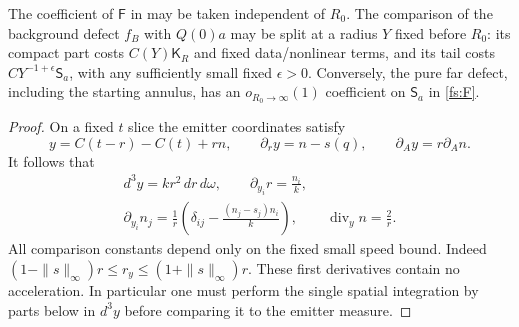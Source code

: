 \begin{lemma}
\label{fs:uniform-coupling}
The coefficient of $\mathsf F$ in  may be taken independent
of $R_0$.  The comparison of the background defect $f_B$ with $Q(0)a$
may be split at a radius $Y$ fixed before $R_0$: its compact part costs
$C(Y)\mathsf K_R$ and fixed data/nonlinear terms, and its tail costs
$C Y^{-1+\epsilon}\mathsf S_a$, with any sufficiently small fixed
$\epsilon>0$.  Conversely, the pure far defect, including the starting
annulus, has an $o_{R_0\to\infty}(1)$ coefficient on $\mathsf S_a$ in
\eqref{fs:F}.
\end{lemma}
\begin{proof}
On a fixed $t$ slice the emitter coordinates satisfy
\[
 y=C(t-r)-C(t)+rn,\qquad
 \partial_r y=n-s(q),\qquad \partial_Ay=r\partial_A n .
\]
It follows that
\begin{equation}
\label{fs:slice-jacobian}
\begin{gathered}
 d^3y=kr^2\,dr\,d\omega,\qquad
 \partial_{y_i}r=\frac{n_i}{k},\\
 \partial_{y_i}n_j=
 \frac1r\left(\delta_{ij}-\frac{(n_j-s_j)n_i}{k}\right),
 \qquad \operatorname{div}_y n=\frac2r .
\end{gathered}
\end{equation}
All comparison constants depend only on the fixed small speed bound.
Indeed
$(1-\|s\|_\infty)r\le r_y\le(1+\|s\|_\infty)r$.
These first derivatives contain no acceleration.  In particular one
must perform the single spatial integration by parts below in $d^3y$
before comparing it to the emitter measure.


\end{proof}

